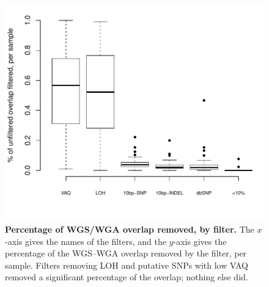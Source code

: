 \documentclass[11pt]{article} %
\begin{document}
{%
\begin{figure}
\centerline{
\includegraphics[width=6in]{boxplot_percent_overlap_filtered.pdf} }
\caption{\textbf{Percentage of WGS/WGA overlap removed, by filter.} The $x$-axis gives the names of the filters, and the $y$-axis gives the percentage of the WGS--WGA overlap removed by the filter, per sample. Filters removing LOH and putative SNPs with low VAQ removed a significant percentage of the overlap; nothing else did.}
\label{fig:boxplot_percent_overlap_filtered}
\end{figure}

}
\end{document}
